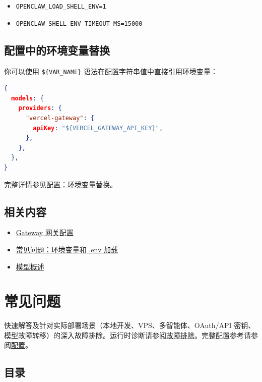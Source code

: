 \begin{itemize}
  \item \texttt{OPENCLAW\_LOAD\_SHELL\_ENV=1}
  \item \texttt{OPENCLAW\_SHELL\_ENV\_TIMEOUT\_MS=15000}
\end{itemize}


\subsection{配置中的环境变量替换}


你可以使用 \texttt{\$\{VAR\_NAME\}} 语法在配置字符串值中直接引用环境变量：

\begin{lstlisting}[language=json]
{
  models: {
    providers: {
      "vercel-gateway": {
        apiKey: "${VERCEL_GATEWAY_API_KEY}",
      },
    },
  },
}
\end{lstlisting}


完整详情参见\href{/gateway/configuration\#env-var-substitution-in-config}{配置：环境变量替换}。

\subsection{相关内容}


\begin{itemize}
  \item \href{/gateway/configuration}{Gateway 网关配置}
  \item \href{/help/faq\#env-vars-and-env-loading}{常见问题：环境变量和 .env 加载}
  \item \href{/concepts/models}{模型概述}
\end{itemize}



\clearpage

\section{常见问题}


快速解答及针对实际部署场景（本地开发、VPS、多智能体、OAuth/API 密钥、模型故障转移）的深入故障排除。运行时诊断请参阅\href{/gateway/troubleshooting}{故障排除}。完整配置参考请参阅\href{/gateway/configuration}{配置}。

\subsection{目录}


